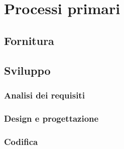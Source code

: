 \chapter{Processi primari}
\section{Fornitura}

\section{Sviluppo}

\subsection{Analisi dei requisiti}
\subsection{Design e progettazione}
\subsection{Codifica}